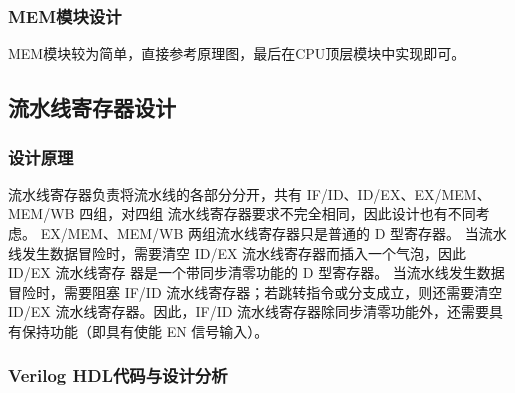 \documentclass[12pt,hyperref,a4paper,UTF8]{ctexart}
\begin{document}
\subsubsection*{MEM模块设计}

MEM模块较为简单，直接参考原理图，最后在CPU顶层模块中实现即可。

\newpage





\subsection{流水线寄存器设计}



\subsubsection*{\Large 设计原理}
\normalsize
流水线寄存器负责将流水线的各部分分开，共有 IF/ID、ID/EX、EX/MEM、MEM/WB 四组，对四组
流水线寄存器要求不完全相同，因此设计也有不同考虑。
EX/MEM、MEM/WB 两组流水线寄存器只是普通的 D 型寄存器。
当流水线发生数据冒险时，需要清空 ID/EX 流水线寄存器而插入一个气泡，因此 ID/EX 流水线寄存
器是一个带同步清零功能的 D 型寄存器。
当流水线发生数据冒险时，需要阻塞 IF/ID 流水线寄存器；若跳转指令或分支成立，则还需要清空
ID/EX 流水线寄存器。因此，IF/ID 流水线寄存器除同步清零功能外，还需要具有保持功能（即具有使能
EN 信号输入）。

\subsubsection*{\Large Verilog HDL代码与设计分析}
\normalsize
\end{document}
